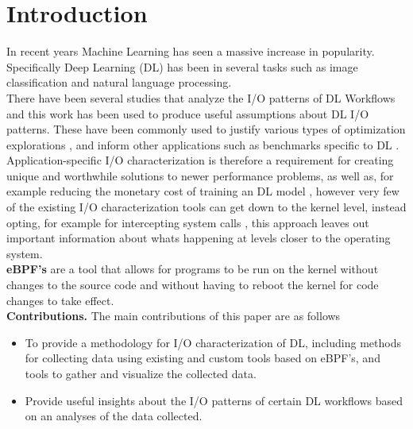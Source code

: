 \documentclass[conference]{IEEEtran}
\begin{document}
\section{Introduction}
In recent years Machine Learning has seen a massive increase in popularity.
Specifically Deep Learning (DL) has been in several tasks such as image classification
and natural language processing.\\
There have been several studies that analyze the I/O patterns of DL Workflows and this work
has been used to produce useful assumptions about DL I/O patterns. These have been commonly used to
justify various types of optimization explorations \cite{LMDB, nvme, beegfsDL, bamboo}, and inform 
other applications such as benchmarks specific to DL \cite{TFbenchmark}. \\
Application-specific I/O characterization is therefore a requirement for creating
unique and worthwhile solutions to
newer performance problems, as well as, for example reducing the monetary cost of training an 
DL model \cite{bamboo}, however very few of the existing I/O characterization tools
can get down to the kernel level, instead opting, for example for intercepting system calls \cite{tfdarshan}, this approach leaves out important information about whats happening at levels closer to the operating system.\\
\textbf{eBPF's} are a tool that allows for programs to be run on the kernel without changes to
the source code and without having to reboot the kernel for code changes to take effect.\\
\textbf{Contributions.} The main contributions of this paper are as follows
\begin{itemize}
    \item To provide a methodology for I/O characterization of DL, including methods for collecting data using existing and custom tools based on eBPF's, and tools to gather and visualize the collected data.
    \item Provide useful insights about the I/O patterns of certain DL workflows based on an analyses of the data collected.
\end{itemize}
\end{document}

